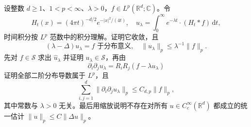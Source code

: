 \begin{exercise}\label{b2:ex:18-new-7}
设整数 \(d\geq1\)、\(1<p<\infty\)、\(\lambda>0\)，\(f\in L^p(\mathbb R^d;\mathbb C)\)。令
\[
 H_t(x)=(4\pi t)^{-d/2}e^{-|x|^2/(4t)},
 \quad u_\lambda=\int_0^\infty e^{-\lambda t}\cdot(H_t*f)\,\mathrm dt,
\]
时间积分按 \(L^p\) 范数中的积分理解。证明它收敛，且
\[
 (\lambda-\Delta)u_\lambda=f\text{ 于分布意义},
 \quad\|u_\lambda\|_p\leq\lambda^{-1}\|f\|_p.
\]
先对 \(f\in\mathcal S\) 求出 \(\widehat u_\lambda\) 并证明 \(u_\lambda\in\mathcal S\)，再由
\[
 \partial_i\partial_ju_\lambda
 =R_iR_j(f-\lambda u_\lambda)
\]
证明全部二阶分布导数属于 \(L^p\)，且
\[
 \sum_{i,j=1}^d\|\partial_i\partial_ju_\lambda\|_p
 \leq C_{d,p}\|f\|_p,
\]
其中常数与 \(\lambda>0\) 无关。最后用缩放说明不存在对所有 \(u\in C_c^\infty(\mathbb R^d)\) 都成立的统一估计
\(\|u\|_p\leq C\|\Delta u\|_p\)。
\end{exercise}

